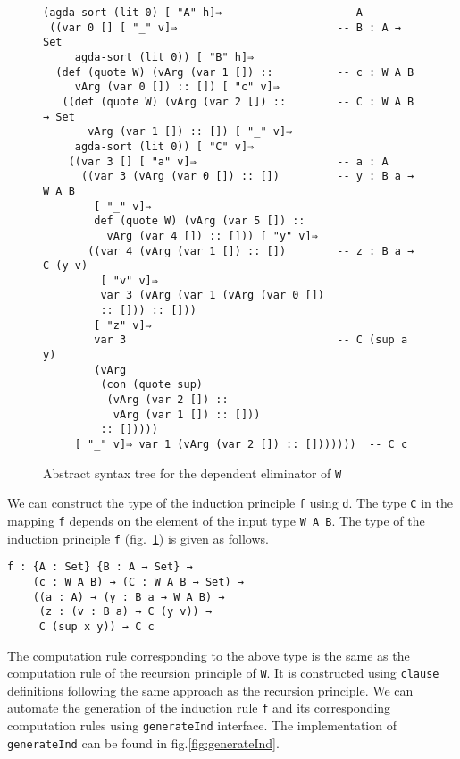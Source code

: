 \documentclass[sigplan,10pt]{acmart}
\begin{document}
\begin{figure}
\begin{center}
\begingroup
\fontsize{7pt}{9pt}\selectfont
\begin{Verbatim}
(agda-sort (lit 0) [ "A" h]⇒                  -- A
 ((var 0 [] [ "_" v]⇒                         -- B : A → Set
     agda-sort (lit 0)) [ "B" h]⇒
  (def (quote W) (vArg (var 1 []) ::          -- c : W A B
     vArg (var 0 []) :: []) [ "c" v]⇒
   ((def (quote W) (vArg (var 2 []) ::        -- C : W A B → Set
       vArg (var 1 []) :: []) [ "_" v]⇒
     agda-sort (lit 0)) [ "C" v]⇒
    ((var 3 [] [ "a" v]⇒                      -- a : A
      ((var 3 (vArg (var 0 []) :: [])         -- y : B a → W A B
        [ "_" v]⇒
        def (quote W) (vArg (var 5 []) :: 
          vArg (var 4 []) :: [])) [ "y" v]⇒
       ((var 4 (vArg (var 1 []) :: [])        -- z : B a → C (y v)
         [ "v" v]⇒
         var 3 (vArg (var 1 (vArg (var 0 []) 
         :: [])) :: []))
        [ "z" v]⇒
        var 3                                 -- C (sup a y)
        (vArg
         (con (quote sup)
          (vArg (var 2 []) :: 
           vArg (var 1 []) :: []))
         :: []))))
     [ "_" v]⇒ var 1 (vArg (var 2 []) :: []))))))  -- C c
\end{Verbatim}
\endgroup
\end{center}
\caption{Abstract syntax tree for the dependent eliminator of {\tt W}}
\label{fig:ast-d'}
\end{figure}
\normalsize

We can construct the type of the induction principle {\tt f} using {\tt d}. The type {\tt C} in the mapping {\tt f} depends on the element of the input type {\tt W A B}. The type of the induction principle {\tt f} (fig.~\ref{fig:ast-d'}) is given as follows.
\begin{center}
\begingroup
\begin{BVerbatim}
f : {A : Set} {B : A → Set} → 
    (c : W A B) → (C : W A B → Set) → 
    ((a : A) → (y : B a → W A B) → 
     (z : (v : B a) → C (y v)) → 
     C (sup x y)) → C c
\end{BVerbatim}
\endgroup
\end{center}
The computation rule corresponding to the above type is the same as the computation rule of the recursion principle of {\tt W}. It is constructed using {\tt clause} definitions following the same approach as the recursion principle.  We can automate the generation of the induction rule {\tt f} and its corresponding computation rules using {\tt generateInd} interface. The implementation of {\tt generateInd} can be found in fig.\eqref{fig:generateInd}.
\end{document}
